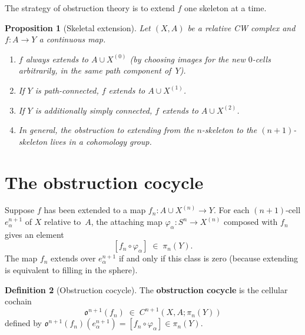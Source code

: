 \documentclass[12pt,a4paper,openany]{book}
\theoremstyle{definition}
\newtheorem{definition}{Definition}[chapter]
\theoremstyle{plain}
\newtheorem{proposition}[definition]{Proposition}
\theoremstyle{remark}
\begin{document}
The strategy of obstruction theory is to extend $f$ one skeleton at a
time.

\begin{proposition}[Skeletal extension]
\label{prop:skeletal-extension}
Let $(X,A)$ be a relative CW complex and $f\colon A\to Y$ a continuous
map.
\begin{enumerate}[label=(\roman*)]
  \item $f$ always extends to $A\cup X^{(0)}$ (by choosing images for
    the new $0$-cells arbitrarily, in the same path component of~$Y$).
  \item If $Y$ is path-connected, $f$ extends to $A\cup X^{(1)}$.
  \item If $Y$ is additionally simply connected, $f$ extends to
    $A\cup X^{(2)}$.
  \item In general, the obstruction to extending from the $n$-skeleton
    to the $(n{+}1)$-skeleton lives in a cohomology group.
\end{enumerate}
\end{proposition}

\section{The obstruction cocycle}\label{sec:obstruction-cocycle}

Suppose $f$ has been extended to a map $f_n\colon A\cup X^{(n)}\to Y$.
For each $(n{+}1)$-cell $e^{n+1}_\alpha$ of $X$ relative to~$A$, the
attaching map
$\varphi_\alpha\colon S^n\to X^{(n)}$ composed with $f_n$ gives
an element
\[
  [f_n\circ\varphi_\alpha]\;\in\;\pi_n(Y).
\]
The map $f_n$ extends over $e^{n+1}_\alpha$ if and only if this class
is zero (because extending is equivalent to filling in the sphere).

\begin{definition}[Obstruction cocycle]
The \textbf{obstruction cocycle} is the cellular cochain
\[
  \mathfrak{o}^{n+1}(f_n)
  \;\in\;
  C^{n+1}(X,A;\pi_n(Y))
\]
defined by
$\mathfrak{o}^{n+1}(f_n)(e^{n+1}_\alpha)
= [f_n\circ\varphi_\alpha]\in\pi_n(Y)$.
\end{definition}
\end{document}
